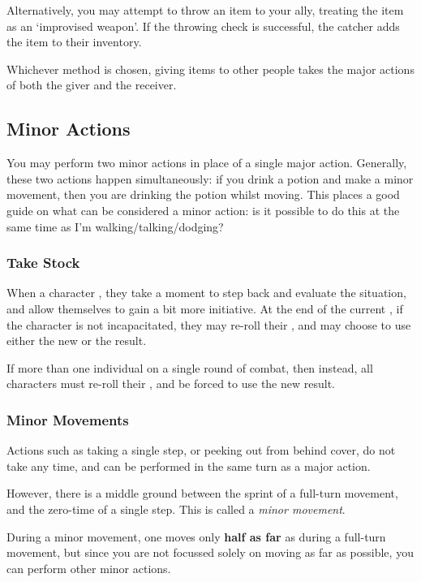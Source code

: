 Alternatively, you may attempt to throw an item to your ally, treating the item as an `improvised weapon'. If the throwing check is successful, the catcher adds the item to their inventory. 

Whichever method is chosen, giving items to other people takes the major actions of both the giver and the receiver. 


\subsection{Minor Actions}
You may perform two minor actions in place of a single major action. Generally, these two actions happen simultaneously: if you drink a potion and make a minor movement, then you are drinking the potion whilst moving. This places a good guide on what can be considered a minor action: is it possible to do this at the same time as I'm walking/talking/dodging? 

\subsubsection{Take Stock}

When a character , they take a moment to step back and evaluate the situation, and allow themselves to gain a bit more initiative. At the end of the current , if the character is not incapacitated, they may re-roll their , and may choose to use either the new or the result.  

If more than one individual  on a single round of combat, then instead, all characters must re-roll their , and be forced to use the new result.

\subsubsection{Minor Movements} 

Actions such as taking a single step, or peeking out from behind cover, do not take any time, and can be performed in the same turn as a major action. 

However, there is a middle ground between the sprint of a full-turn movement, and the zero-time of a single step. This is called a {\it minor movement}. 

During a minor movement, one moves only {\bf half as far} as during a full-turn movement, but since you are not focussed solely on moving as far as possible, you can perform other minor actions. 


